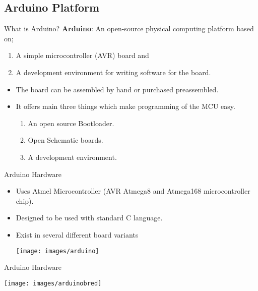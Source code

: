 \documentclass{beamer}
\begin{document}
\begin{darkframes}
\section{Arduino Platform}  
\begin{frame}[<+->]{What is Arduino?}
	\textbf{Arduino}: An open-source physical computing platform based on; 
	\begin{enumerate}
		\item A simple microcontroller (AVR) board and 
		\item A development environment for writing software for the board.
	\end{enumerate}
	\begin{itemize}
		\item The board can be assembled by hand or purchased preassembled.
		\item It offers main three things which make programming of the MCU easy.
		\begin{enumerate}
			\item An open source Bootloader.
			\item Open Schematic boards.
			\item A development environment.
		\end{enumerate}
	\end{itemize}
\end{frame}        


\begin{frame}[<+->]{Arduino Hardware}
	
	\begin{itemize}
		\item Uses Atmel Microcontroller (AVR Atmega8 and   Atmega168 microcontroller chip).
		\item Designed to be used with standard C language.
		\item Exist in several different board variants
		\begin{center}
			\texttt{[image: images/arduino]} 
		\end{center}
	\end{itemize}
\end{frame}        

\begin{frame}[<+->]{Arduino Hardware}
	\begin{center}
		\texttt{[image: images/arduinobred]} 
	\end{center}
\end{frame}   





\end{darkframes}
\end{document}
